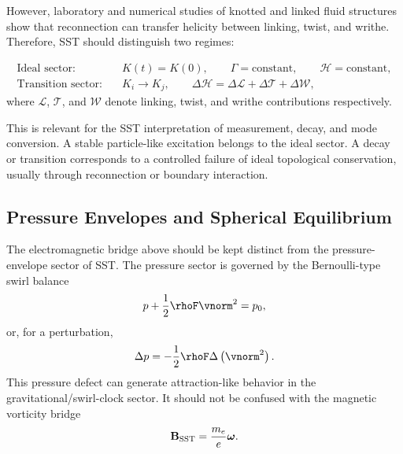    However, laboratory and numerical studies of knotted and linked fluid
    structures show that reconnection can transfer helicity between linking,
    twist, and writhe.  Therefore, SST should distinguish two regimes:
    
    \begin{align}
        \text{Ideal sector:}
        \quad
        &K(t)=K(0),
        \qquad
        \Gamma=\text{constant},
        \qquad
        \mathcal{H}=\text{constant},
        \label{eq:ideal_topology_sector}
        \\
        \text{Transition sector:}
        \quad
        &K_i\rightarrow K_j,
        \qquad
        \Delta\mathcal{H}
        =
        \Delta\mathcal{L}
        +
        \Delta\mathcal{T}
        +
        \Delta\mathcal{W},
        \label{eq:transition_topology_sector}
    \end{align}
    where \(\mathcal{L}\), \(\mathcal{T}\), and \(\mathcal{W}\) denote
    linking, twist, and writhe contributions respectively.
    
    This is relevant for the SST interpretation of measurement, decay, and
    mode conversion.  A stable particle-like excitation belongs to the ideal
    sector.  A decay or transition corresponds to a controlled failure of
    ideal topological conservation, usually through reconnection or boundary
    interaction.

\subsection{Pressure Envelopes and Spherical Equilibrium}
    
    The electromagnetic bridge above should be kept distinct from the
    pressure-envelope sector of SST.  The pressure sector is governed by the
    Bernoulli-type swirl balance
    \begin{equation}
        p
        +
        \frac{1}{2}\rhoF\vnorm^2
        =
        p_0,
        \label{eq:bernoulli_swirl_pressure}
    \end{equation}
    or, for a perturbation,
    \begin{equation}
        \Delta p
        =
        -
        \frac{1}{2}\rhoF
        \Delta\left(\vnorm^2\right).
        \label{eq:pressure_defect}
    \end{equation}
    This pressure defect can generate attraction-like behavior in the
    gravitational/swirl-clock sector.  It should not be confused with the
    magnetic vorticity bridge
    \begin{equation}
        \mathbf{B}_{\rm SST}
        =
        \frac{m_e}{e}\boldsymbol{\omega}.
    \end{equation}
    
